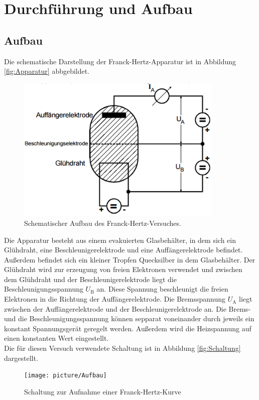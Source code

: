 \section{Durchführung und Aufbau}
\label{sec:Durchführung}
\subsection{Aufbau}
Die schematische Darstellung der Franck-Hertz-Apparatur ist in Abbildung \eqref{fig:Apparatur} abbgebildet.

\begin{figure}[H]
  \centering
  \includegraphics[height=7cm]{picture/Franck-Hertz-Apparatur}
  \caption{Schematischer Aufbau des Franck-Hertz-Versuches. \cite[2]{sample}}
  \label{fig:Apparatur}
\end{figure}

Die Apparatur besteht aus einem evakuierten Glasbehälter, in dem sich ein Glühdraht, eine Beschleunigerelektrode und eine Auffängerelektrode befindet. Außerdem befindet sich ein kleiner Tropfen Quecksilber in dem Glasbehälter. Der Glühdraht wird zur erzeugung von freien Elektronen verwendet und zwischen dem Glühdraht und der Beschleunigerelektrode liegt die Beschleunigungsspannung $U_\text{B}$ an. Diese Spannung beschleunigt die freien Elektronen in die Richtung der Auffängerelektrode. Die Bremsspannung $U_\text{A}$ liegt zwischen der Auffängerelektrode und der Beschleunigerelektrode an. Die Brems- und die Beschleunigungsspannung können sepparat voneinander durch jeweils ein konstant Spannungsgerät geregelt werden. Außerdem wird die Heizspannung auf einen konstanten Wert eingestellt. \\
Die für diesen Versuch verwendete Schaltung ist in Abbildung \eqref{fig:Schaltung} dargestellt.

\begin{figure}[H]
  \centering
  \texttt{[image: picture/Aufbau]}
  \caption{Schaltung zur Aufnahme einer Franck-Hertz-Kurve}
  \label{fig:Schaltung}
\end{figure}

